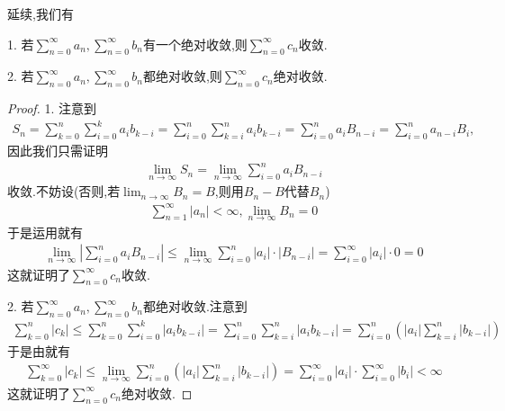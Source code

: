 \documentclass[../../main.tex]{subfiles}
\begin{document}
\begin{theorem}[Cauchy积收敛定理]\label{theorem:Cauchy积收敛定理}
延续,我们有

1. 若$\sum\limits_{n=0}^{\infty} a_n,\sum\limits_{n=0}^{\infty} b_n$有一个绝对收敛,则$\sum\limits_{n=0}^{\infty} c_n$收敛.

2. 若$\sum\limits_{n=0}^{\infty} a_n,\sum\limits_{n=0}^{\infty} b_n$都绝对收敛,则$\sum\limits_{n=0}^{\infty} c_n$绝对收敛.
\end{theorem}
\begin{proof}
1. 注意到
\begin{align*}
S_n = \sum\limits_{k=0}^{n} \sum\limits_{i=0}^{k} a_i b_{k-i} = \sum\limits_{i=0}^{n} \sum\limits_{k=i}^{n} a_i b_{k-i} = \sum\limits_{i=0}^{n} a_i B_{n-i} = \sum\limits_{i=0}^{n} a_{n-i} B_i,
\end{align*}
因此我们只需证明
\begin{align*}
\lim\limits_{n\to\infty} S_n = \lim\limits_{n\to\infty}\sum\limits_{i=0}^{n} a_i B_{n-i}
\end{align*}
收敛.不妨设(否则,若$\lim_{n\to\infty}B_n=B$,则用$B_n-B$代替$B_n$)
\begin{align*}
\sum\limits_{n=1}^{\infty} |a_n| < \infty,\lim\limits_{n\to\infty} B_n = 0
\end{align*}
于是运用就有
\begin{align*}
\lim\limits_{n\to\infty} \left| \sum\limits_{i=0}^{n} a_i B_{n-i} \right| \leqslant \lim\limits_{n\to\infty} \sum\limits_{i=0}^{n} |a_i| \cdot |B_{n-i}| = \sum\limits_{i=0}^{\infty} |a_i| \cdot 0 = 0
\end{align*}
这就证明了$\sum\limits_{n=0}^{\infty} c_n$收敛.

2. 若$\sum\limits_{n=0}^{\infty} a_n,\sum\limits_{n=0}^{\infty} b_n$都绝对收敛.注意到
\begin{align*}
\sum\limits_{k=0}^{n} |c_k| \leqslant \sum\limits_{k=0}^{n} \sum\limits_{i=0}^{k} |a_i b_{k-i}| = \sum\limits_{i=0}^{n} \sum\limits_{k=i}^{n} |a_i b_{k-i}| = \sum\limits_{i=0}^{n} \left( |a_i| \sum\limits_{k=i}^{n} |b_{k-i}| \right)
\end{align*}
于是由就有
\begin{align*}
\sum\limits_{k=0}^{\infty} |c_k| \leqslant \lim\limits_{n\to\infty} \sum\limits_{i=0}^{n} \left( |a_i| \sum\limits_{k=i}^{n} |b_{k-i}| \right) = \sum\limits_{i=0}^{\infty} |a_i| \cdot \sum\limits_{i=0}^{\infty} |b_i| < \infty
\end{align*}
这就证明了$\sum\limits_{n=0}^{\infty} c_n$绝对收敛.

\end{proof}
\end{document}
